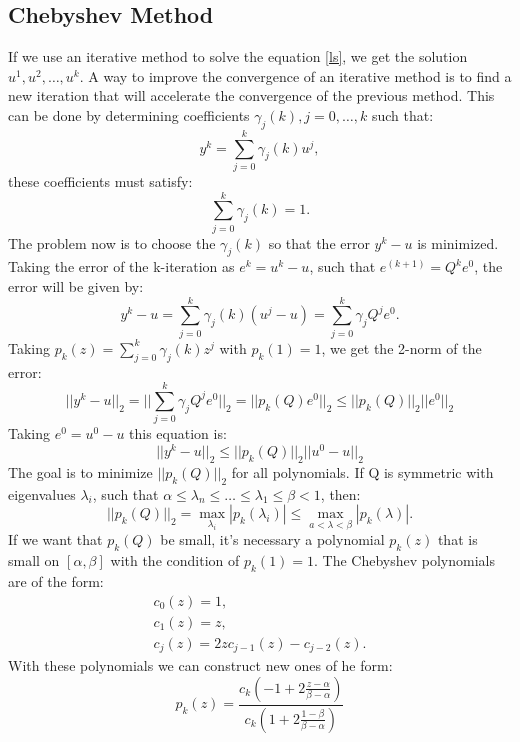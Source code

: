 \documentclass[a4paper,10pt]{report}
\begin{document}
\subsection{Chebyshev Method}
If we use an iterative method to solve  the equation \eqref{ls}, we get the solution $u^1, u^2, \dots, u^k$. A way to improve the convergence of an iterative method
is to find a new iteration that will accelerate the convergence of the previous method. This can be done by determining coefficients
$\gamma_{j}(k), j=0,\dots,k$ such that:
$$y^k=\sum_{j=0}^k \gamma_{j}(k) u^j,$$
these coefficients must satisfy: $$\sum_{j=0}^k \gamma_{j}(k)=1.$$
The problem now is to choose the $\gamma_j(k)$ so that the error $y^k-u$ is minimized.
Taking the error of the k-iteration as $e^k=u^k-u$, such that $e^{(k+1)}=Q^ke^0$, the error will be given by:
\begin{equation*}
y^k-u=\sum_{j=0}^k \gamma_j(k)(u^j-u)=\sum_{j=0}^k\gamma_jQ^je^0.
\end{equation*}
Taking $p_k(z)=\sum_{j=0}^k\gamma_j(k)z^j$ with $p_k(1)=1$, we get the 2-norm of the error:
\begin{equation*}
 ||y^k-u||_2=||\sum_{j=0}^k\gamma_jQ^je^0||_2=||p_k(Q)e^0||_2 \leq||p_k(Q)||_2||e^0||_2
\end{equation*}
Taking $e^0=u^0-u$ this equation is:
\begin{equation*}
 ||y^k-u||_2\leq ||p_k(Q)||_2||u^0-u||_2
\end{equation*}
The goal is to minimize $||p_k(Q)||_2$ for all polynomials. If Q is symmetric with eigenvalues $\lambda_i$, such that
$\alpha \leq \lambda_n \leq \dots \leq \lambda_1 \leq \beta <1$, then:
\begin{equation*}
||p_k(Q)||_2=\max_{\lambda_i}|p_k(\lambda_i)| \leq \max_{a<\lambda<\beta}|p_k(\lambda)|.
\end{equation*}
If we want that $p_k(Q)$ be small, it's necessary a polynomial $p_k(z)$ that is small on $[\alpha,\beta]$ with the condition of $p_k(1)=1$.
The Chebyshev polynomials are of the form:
\begin{gather*}
 c_0(z)=1,\\
 c_1(z)=z,\\
 c_j(z)=2zc_{j-1}(z)-c_{j-2}(z).
\end{gather*}
With these polynomials we can construct new ones of he form:
\begin{equation}
 p_k(z)=\frac{c_k(-1+2\frac{z-\alpha}{\beta-\alpha})}{c_k(1+2\frac{1-\beta}{\beta-\alpha})}
\end{equation}
\end{document}
